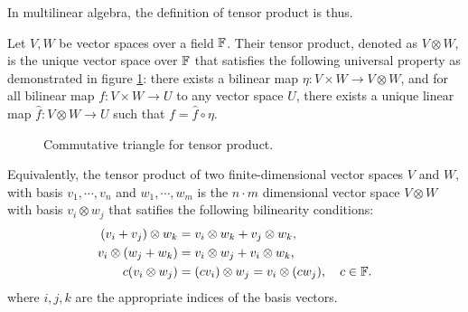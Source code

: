 In multilinear algebra, the definition of tensor product is thus. 

\begin{definition}
	Let $V, W$ be vector spaces over a field $\mathbb{F}$. Their tensor product, denoted as $V \otimes W$, is the unique vector space over $\mathbb{F}$ that satisfies the following universal property as demonstrated in figure \ref{fig:tensor-product-universal}:
	there exists a bilinear map $\eta: V\times W \rightarrow V \otimes W $, and for all bilinear map $f : V \times W \rightarrow U$ to any vector space $U$, there exists a unique linear map $\hat{f} : V \otimes W \rightarrow U$ such that $f = \hat{f} \circ \eta$. 
\end{definition}

\begin{figure}[ht]
	\centering 
	\caption{Commutative triangle for tensor product.}\label{fig:tensor-product-universal}
\end{figure}

Equivalently, the tensor product of two finite-dimensional vector spaces $V$ and $W$, with basis $v_1, \cdots, v_n$ and $w_1, \cdots, w_m$ is the $n\cdot m$ dimensional vector space $V \otimes W$ with basis $v_i \otimes w_j$ that satifies the following bilinearity conditions:
\begin{equation*}
	\begin{aligned}
		(v_i + v_j) \otimes w_k &= v_i \otimes w_k + v_j \otimes w_k, \\
		v_i \otimes (w_j + w_k) &= v_i \otimes w_j + v_i \otimes w_k, \\
		c (v_i \otimes w_j) &= (c v_i) \otimes w_j = v_i \otimes (c w_j), \quad c \in \mathbb{F}.
	\end{aligned}
\end{equation*}
where $i, j, k$ are the appropriate indices of the basis vectors.

